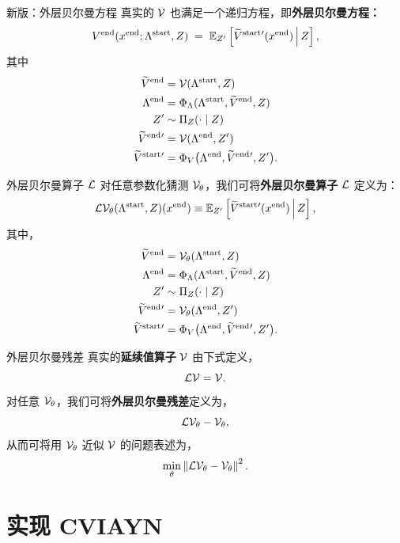 \documentclass[10pt,aspectratio=169]{beamer}
\begin{document}
\begin{frame}{新版：外层贝尔曼方程}
  真实的 $\CV$ 也满足一个递归方程，即\textbf{外层贝尔曼方程：}
  \[
    \Vend(\xend; \Lstart, Z) \;=\; \E_{Z'}\psq{\Vstarttil{}'(\xend)\,\Big|\, Z},
  \]
  其中
  \begin{align*}
    \Vendtil &= \CV(\Lstart, Z) \\
    \Lend &= \Phi_\Lambda(\Lstart, \Vendtil, Z) \\
    Z' &\sim \Pi_Z(\cdot \mid Z) \\
    \Vendtil{}' &= \CV(\Lend, Z') \\
    \Vstarttil{}'  &= \Phi_V\bigl(\Lend, \Vendtil{}', Z'\bigr).
  \end{align*}
\end{frame}

\begin{frame}{外层贝尔曼算子 $\CL$}
  对任意参数化猜测 $\CV_\theta$，我们可将\textbf{外层贝尔曼算子} $\CL$ 定义为：
  \[
    \CL\CV_\theta(\Lstart, Z)(\xend) \equiv \E_{Z'}\psq{\Vstarttil{}'(\xend)\,\Big|\, Z},
  \]
  其中，
  \begin{align*}
    \Vendtil &= \CV_\theta(\Lstart, Z) \\
    \Lend &= \Phi_\Lambda(\Lstart, \Vendtil, Z) \\
    Z' &\sim \Pi_Z(\cdot \mid Z) \\
    \Vendtil{}' &= \CV_\theta(\Lend, Z') \\
    \Vstarttil{}'  &= \Phi_V\bigl(\Lend, \Vendtil{}', Z'\bigr).
  \end{align*}
\end{frame}

\begin{frame}{外层贝尔曼残差}
  真实的\textbf{延续值算子} $\CV$ 由下式定义，
  \[
    \CL\CV = \CV.
  \]
  对任意 $\CV_\theta$，我们可将\textbf{外层贝尔曼残差}定义为，
  \[
    \CL\CV_\theta - \CV_\theta,
  \]
  从而可将用 $\CV_\theta$ 近似 $\CV$ 的问题表述为，
  \[
    \min_\theta \norm{\CL\CV_\theta - \CV_\theta}^2.
  \]
\end{frame}

\section[实现 CVIAYN]{实现 CVIAYN}
\end{document}
